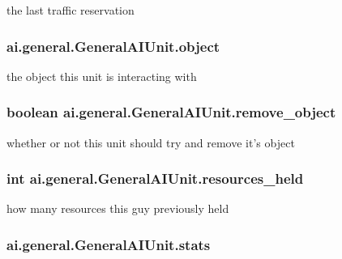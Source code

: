 \label{classai_1_1general_1_1_general_a_i_unit_a2c60d61b836e15fa9c579dc40a69c7fa}
the last traffic reservation \hypertarget{classai_1_1general_1_1_general_a_i_unit_a9dce2b60192207869f5ce328141109dd}{
\subsubsection[{object}]{ {\bf ai.general.GeneralAIUnit.object}}}
\label{classai_1_1general_1_1_general_a_i_unit_a9dce2b60192207869f5ce328141109dd}
the object this unit is interacting with \hypertarget{classai_1_1general_1_1_general_a_i_unit_a4dc3dee95c57ff68b980e24ca52bdefa}{
\subsubsection[{remove\_\-object}]{\setlength{\rightskip}{0pt plus 5cm}boolean {\bf ai.general.GeneralAIUnit.remove\_\-object}}}
\label{classai_1_1general_1_1_general_a_i_unit_a4dc3dee95c57ff68b980e24ca52bdefa}
whether or not this unit should try and remove it's object \hypertarget{classai_1_1general_1_1_general_a_i_unit_ab7a37df2a99bf4d6c18cbbb1477cf0c8}{
\subsubsection[{resources\_\-held}]{\setlength{\rightskip}{0pt plus 5cm}int {\bf ai.general.GeneralAIUnit.resources\_\-held}}}
\label{classai_1_1general_1_1_general_a_i_unit_ab7a37df2a99bf4d6c18cbbb1477cf0c8}
how many resources this guy previously held \hypertarget{classai_1_1general_1_1_general_a_i_unit_aa117dac9c797112c91e035b392fb5dde}{
\subsubsection[{stats}]{ {\bf ai.general.GeneralAIUnit.stats}}}
